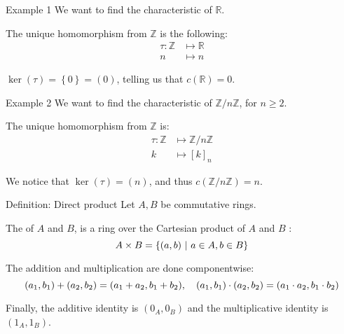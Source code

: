 \documentclass[a4paper]{article}
\begin{document}
\begin{parag}{Example 1}
    We want to find the characteristic of $\mathbb{R}$.

    The unique homomorphism from $\mathbb{Z}$ is the following:
    \[\begin{split}
    \tau: \mathbb{Z} &\longmapsto \mathbb{R} \\
    n &\longmapsto n
    \end{split}\]
    
    $\ker\left(\tau\right) = \left\{0\right\} = \left(0\right)$, telling us that $c\left(\mathbb{R}\right) = 0$. 
\end{parag}

\begin{parag}{Example 2}
    We want to find the characteristic of $\mathbb{Z}/n\mathbb{Z}$, for $n \geq 2$.

    The unique homomorphism from $\mathbb{Z}$ is: 
    \[\begin{split}
    \tau: \mathbb{Z} &\longmapsto \mathbb{Z}/n\mathbb{Z} \\
    k &\longmapsto \left[k\right]_n
    \end{split}\]
    
    We notice that $\ker\left(\tau\right) = \left(n\right)$, and thus $c\left(\mathbb{Z}/n\mathbb{Z}\right) = n$.
\end{parag}

\begin{parag}{Definition: Direct product}
    Let $A, B$ be commutative rings.

    The  of $A$ and $B$, is a ring over the Cartesian product of $A$ and $B$ :
    \[A \times B = \left\{\left(a, b\right) \suchthat a \in A, b \in B\right\}\]
    
    The addition and multiplication are done componentwise: 
    \[\left(a_1, b_1\right) + \left(a_2, b_2\right)= \left(a_1 + a_2, b_1 + b_2\right), \mathspace \left(a_1, b_1\right)\cdot \left(a_2, b_2\right) =\left(a_1\cdot a_2, b_1\cdot b_2\right)\]
    
    Finally, the additive identity is $\left(0_A, 0_B\right)$ and the multiplicative identity is $\left(1_A, 1_B\right)$.
\end{parag}
\end{document}
